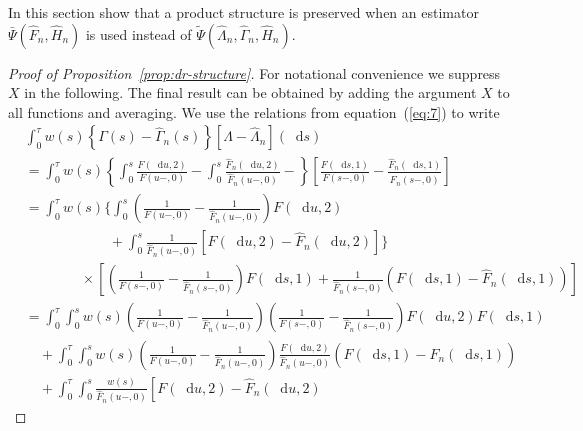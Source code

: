 \documentclass[unnumsec,webpdf,contemporary,large,namedate]{oup-authoring-template}%
\theoremstyle{thmstyleone}%
\theoremstyle{thmstyletwo}%
\theoremstyle{thmstylethree}%
\newcommand*\diff{\mathop{}\!\mathrm{d}}
\newcommand{\1}{\mathds{1}}
\begin{document}
\begin{appendices}
In this section show that a product structure is preserved when an estimator
$\bar\Psi(\hat{F}_n, \hat{H}_n)$ is used instead of
$\tilde\Psi(\hat{\Lambda}_n, \hat{\Gamma}_n, \hat{H}_n)$.


\begin{proof}[Proof of Proposition~\ref{prop:dr-structure}]
  For notational convenience we suppress \( X \) in the following. The final
  result can be obtained by adding the argument \( X \) to all functions and
  averaging. We use the relations from equation~(\ref{eq:7}) to write
  \begin{align*}
    & \int_0^{\tau} w(s) 
      \left\{
      \Gamma(s) - \hat{\Gamma}_n(s)
      \right\}
      [\Lambda - \hat{\Lambda}_n](\diff s)
    \\
    & =
      \int_0^{\tau} w(s) 
      \left\{
      \int_0^s \frac{F(\diff u, 2)}{F(u-, 0)} -
      \int_0^s \frac{\hat{F}_n(\diff u, 2)}{\hat{F}_n(u-, 0)}  -
      \right\}
      \left[
      \frac{F(\diff s, 1)}{F(s-, 0)}
      - \frac{\hat{F}_n(\diff s, 1)}{\hat{F}_n(s-, 0)}
      \right]
    \\
    & =
      \int_0^{\tau} w(s) 
      \Bigg\{
      \int_0^s 
      \left(
      \frac{1}{F(u-, 0)} -  \frac{1}{\hat{F}_n(u-, 0)}
      \right) F(\diff u, 2)
    \\
    & \qquad\qquad \qquad
      +
      \int_0^s \frac{1}{\hat{F}_n(u-, 0)} 
      \left[
      F(\diff u, 2) - \hat{F}_n(\diff u, 2)
      \right]
      \Bigg\}
    \\
    & \qquad\qquad \times
      \left[
      \left(
      \frac{1}{F(s-, 0)} -
      \frac{1}{\hat{F}_n(s-, 0)}
      \right)F(\diff s, 1)
       + \frac{1}{\hat{F}_n(s-, 0)}
      \left(
      F(\diff s, 1) -
      \hat{F}_n(\diff s, 1)
      \right)
      \right]
    \\
    &
      = \int_0^{\tau} 
      \int_0^s
      w(s) 
      \left(
      \frac{1}{F(u-, 0)} -  \frac{1}{\hat{F}_n(u-, 0)}
      \right) 
      \left(
      \frac{1}{F(s-, 0)} -
      \frac{1}{\hat{F}_n(s-, 0)}
      \right)F(\diff u, 2)F(\diff s, 1)
    \\
    & \quad +
      \int_0^{\tau}
      \int_0^s
      w(s) 
      \left(
      \frac{1}{F(u-, 0)} -  \frac{1}{\hat{F}_n(u-, 0)}
      \right) \frac{F(\diff u, 2) }{\hat{F}_n(u-,0)}
      \left(
      F(\diff s, 1) -
      \hat{F}_n(\diff s, 1)
      \right)
    \\
    & \quad +
      \int_0^{\tau} 
      \int_0^s      
      \frac{w(s) }{\hat{F}_n(u-, 0)} 
      \left[
      F(\diff u, 2) - \hat{F}_n(\diff u, 2)

\end{align*}
\end{proof}
\end{appendices}
\end{document}
